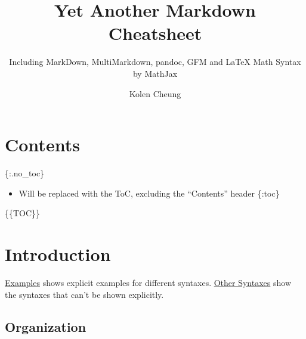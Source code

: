 \documentclass[]{article}
\title{Yet Another Markdown Cheatsheet}
\subtitle{Including MarkDown, MultiMarkdown, pandoc, GFM and LaTeX Math Syntax by
MathJax}
\author{Kolen Cheung}
\date{}
\providecommand{\tightlist}{%
  \setlength{\itemsep}{0pt}\setlength{\parskip}{0pt}}
\begin{document}
\maketitle

{
\hypersetup{linkcolor=blue}
\setcounter{tocdepth}{6}
\tableofcontents
}
\section{Contents}\label{contents}

\{:.no\_toc\}

\begin{itemize}
\tightlist
\item
  Will be replaced with the ToC, excluding the ``Contents'' header
  \{:toc\}
\end{itemize}

\{\{TOC\}\}

\section{Introduction}\label{introduction}

\protect\hyperlink{examples}{Examples} shows explicit examples for
different syntaxes. \protect\hyperlink{other-syntaxes}{Other Syntaxes}
show the syntaxes that can't be shown explicitly.

\subsection{Organization}\label{organization}
\end{document}
